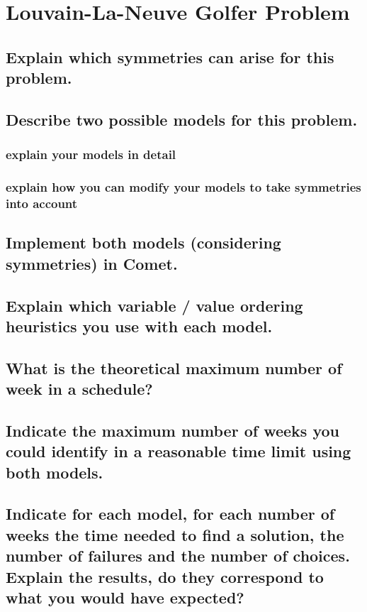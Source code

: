 \documentclass[a4paper ,12pt,french]{article}
\begin{document}
\tableofcontents %

\thispagestyle{fancy}

\pagebreak
\setcounter{page}{1}
\pagestyle{fancy} %

\section{Louvain-La-Neuve Golfer Problem}
\subsection{Explain which symmetries can arise for this problem.}
\subsection{Describe two possible models for this problem. }
\subsubsection{explain your models in detail}
\subsubsection{explain how you can modify your models to take symmetries into account}
\subsection{Implement both models (considering symmetries) in Comet.}
\subsection{Explain which variable / value ordering heuristics you use with each model.}
\subsection{What is the theoretical maximum number of week in a schedule?}
\subsection{Indicate the maximum number of weeks you could identify in a reasonable time limit using both models.}
\subsection{Indicate for each model, for each number of weeks the time needed to find a solution, the number of failures and the number of choices. Explain the results, do they correspond to what you would have expected?}
\end{document}

